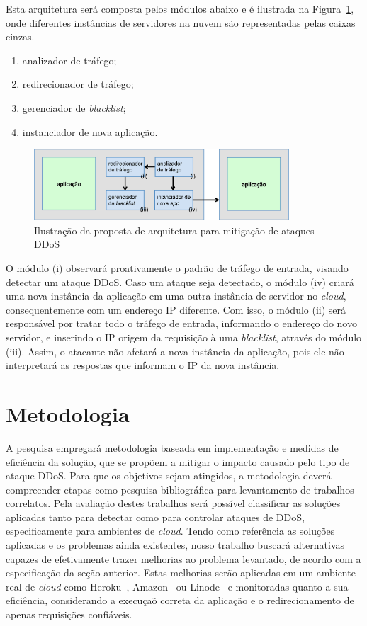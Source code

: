 \documentclass[a4paper, 11pt]{article}
\begin{document}
Esta arquitetura será composta pelos módulos abaixo e é ilustrada na
Figura~\ref{fig:arq}, onde diferentes inst\^ancias de servidores na nuvem s\~ao
representadas pelas caixas cinzas.

\begin{enumerate}[i]
  \item analizador de tráfego;
  \item redirecionador de tráfego;
  \item gerenciador de \emph{blacklist};
  \item instanciador de nova aplica\c{c}\~{a}o.
\end{enumerate}

\begin{figure}[h!]
\centering
\includegraphics[width=0.85\textwidth]{arquitetura.eps}
\caption{Ilustração da proposta de arquitetura para mitigação de ataques DDoS}
\label{fig:arq}
\end{figure}

O módulo (i) observará proativamente o padrão de tráfego de entrada, visando
detectar um ataque DDoS. Caso um ataque seja detectado, o m\'odulo (iv) criará
uma nova
instância da aplicação em uma outra instância de servidor no \emph{cloud},
consequentemente com um endereço IP diferente.
Com isso, o módulo (ii) será responsável por tratar todo o tráfego de
entrada, informando o endereço do novo servidor, e inserindo o IP origem da
requisição à uma \emph{blacklist}, através do módulo (iii). Assim, o
atacante não afetará a nova instância da aplicação, pois ele não interpretará as
respostas que informam o IP da nova instância.


\section{Metodologia}
A pesquisa empregar\'a metodologia baseada em implementa\c{c}\~{a}o e medidas de
efici\^encia da solu\c{c}\~{a}o, que se propõem a mitigar o impacto causado pelo
tipo de ataque DDoS. Para que os objetivos sejam atingidos, a metodologia
dever\'a
compreender etapas como pesquisa bibliogr\'afica para levantamento de trabalhos
correlatos. Pela avalia\c{c}\~{a}o destes trabalhos ser\'a poss\'ivel
classificar as
solu\c{c}\~oes aplicadas tanto para detectar como para controlar ataques de
DDoS,
especificamente para ambientes de \emph{cloud}. Tendo como refer\^encia as
solu\c{c}\~oes aplicadas e os problemas ainda existentes, nosso trabalho
buscar\'a
alternativas capazes de efetivamente trazer melhorias ao problema levantado,
de acordo com a especificação da seção anterior.
Estas melhorias ser\~ao aplicadas em um ambiente real de \emph{cloud} como
Heroku~\cite{heroku}, Amazon~\cite{amazon}
ou Linode~\cite{linode} e monitoradas quanto a sua efici\^encia, considerando a
execu\c{c}a\~o correta da aplica\c{c}\~{a}o e o redirecionamento de apenas
requisições
confi\'aveis.
\end{document}
